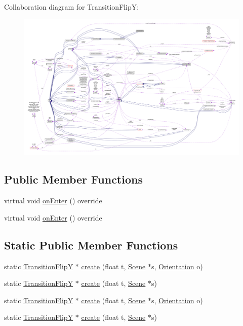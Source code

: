 Collaboration diagram for Transition\+FlipY\+:
\nopagebreak
\begin{figure}[H]
\begin{center}
\leavevmode
\includegraphics[width=350pt]{classTransitionFlipY__coll__graph}
\end{center}
\end{figure}
\subsection*{Public Member Functions}
\begin{DoxyCompactItemize}
\item 
virtual void \hyperlink{classTransitionFlipY_a51bbed9d1827d77df16747731fe17e00}{on\+Enter} () override
\item 
virtual void \hyperlink{classTransitionFlipY_a55d7608988c869dc431bf2cff7601aaa}{on\+Enter} () override
\end{DoxyCompactItemize}
\subsection*{Static Public Member Functions}
\begin{DoxyCompactItemize}
\item 
static \hyperlink{classTransitionFlipY}{Transition\+FlipY} $\ast$ \hyperlink{classTransitionFlipY_ad2b713d0792a2726dd92f953b2afdfdb}{create} (float t, \hyperlink{classScene}{Scene} $\ast$s, \hyperlink{classTransitionScene_a0b2b247806fb10a20de0cbc554210c4d}{Orientation} o)
\item 
static \hyperlink{classTransitionFlipY}{Transition\+FlipY} $\ast$ \hyperlink{classTransitionFlipY_a9cc81f4355ccd23d6a2b9be29d5fed43}{create} (float t, \hyperlink{classScene}{Scene} $\ast$s)
\item 
static \hyperlink{classTransitionFlipY}{Transition\+FlipY} $\ast$ \hyperlink{classTransitionFlipY_a70db9092f3fcf6af3fe5516b5e6744b2}{create} (float t, \hyperlink{classScene}{Scene} $\ast$s, \hyperlink{classTransitionScene_a0b2b247806fb10a20de0cbc554210c4d}{Orientation} o)
\item 
static \hyperlink{classTransitionFlipY}{Transition\+FlipY} $\ast$ \hyperlink{classTransitionFlipY_a5ddfa95d7eb98a1474f1f6caeb35ad91}{create} (float t, \hyperlink{classScene}{Scene} $\ast$s)
\end{DoxyCompactItemize}
